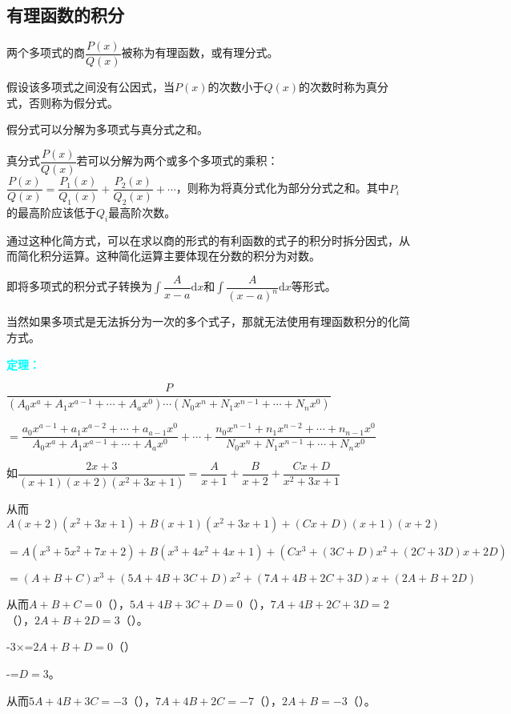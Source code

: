 \documentclass[UTF8, 12pt]{ctexart}
\begin{document}
        \subsection{有理函数的积分}

        两个多项式的商$\dfrac{P(x)}{Q(x)}$被称为有理函数，或有理分式。

        假设该多项式之间没有公因式，当$P(x)$的次数小于$Q(x)$的次数时称为真分式，否则称为假分式。

        假分式可以分解为多项式与真分式之和。

        真分式$\dfrac{P(x)}{Q(x)}$若可以分解为两个或多个多项式的乘积：$\dfrac{P(x)}{Q(x)}=\dfrac{P_1(x)}{Q_1(x)}+\dfrac{P_2(x)}{Q_2(x)}+\cdots$，则称为将真分式化为部分分式之和。其中$P_i$的最高阶应该低于$Q_i$最高阶次数。

        通过这种化简方式，可以在求以商的形式的有利函数的式子的积分时拆分因式，从而简化积分运算。这种简化运算主要体现在分数的积分为对数。

        即将多项式的积分式子转换为$\displaystyle{\int\dfrac{A}{x-a}\textrm{d}x}$和$\displaystyle{\int\dfrac{A}{(x-a)^n}\textrm{d}x}$等形式。

        当然如果多项式是无法拆分为一次的多个式子，那就无法使用有理函数积分的化简方式。

        \textcolor{aqua}{\textbf{定理：}}

        $\dfrac{P}{(A_0x^a+A_1x^{a-1}+\cdots+A_ax^0)\cdots(N_0x^n+N_1x^{n-1}+\cdots+N_nx^0)}$ \medskip

        $=\dfrac{a_0x^{a-1}+a_1x^{a-2}+\cdots+a_{a-1}x^0}{A_0x^a+A_1x^{a-1}+\cdots+A_ax^0}+\cdots+\dfrac{n_0x^{n-1}+n_1x^{n-2}+\cdots+n_{n-1}x^0}{N_0x^n+N_1x^{n-1}+\cdots+N_nx^0}$ \medskip

        如$\dfrac{2x+3}{(x+1)(x+2)(x^2+3x+1)}=\dfrac{A}{x+1}+\dfrac{B}{x+2}+\dfrac{Cx+D}{x^2+3x+1}$ \medskip

        从而$A(x+2)(x^2+3x+1)+B(x+1)(x^2+3x+1)+(Cx+D)(x+1)(x+2)$

        $=A(x^3+5x^2+7x+2)+B(x^3+4x^2+4x+1)+(Cx^3+(3C+D)x^2+(2C+3D)x+2D)$

        $=(A+B+C)x^3+(5A+4B+3C+D)x^2+(7A+4B+2C+3D)x+(2A+B+2D)$

        从而$A+B+C=0$（），$5A+4B+3C+D=0$（），$7A+4B+2C+3D=2$（），$2A+B+2D=3$（）。

        -3×=$2A+B+D=0$（）

        -=$D=3$。

        从而$5A+4B+3C=-3$（），$7A+4B+2C=-7$（），$2A+B=-3$（）。
\end{document}
